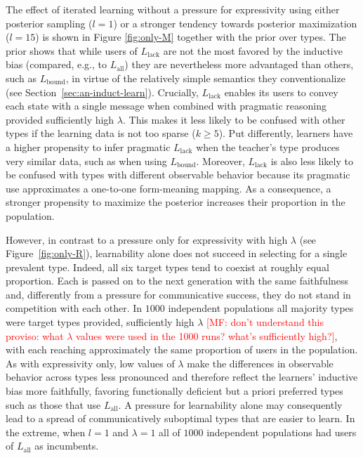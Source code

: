 \documentclass[a4paper, 11pt]{article}
\theoremstyle{Satz}
\newcommand{\mf}[1]{\textcolor{Red}{[MF: #1]}}
\newcommand{\mylang}[1]{\ensuremath{L_{\text{#1}}}\xspace} %
\newcommand{\Lall}{\mylang{all}}
\newcommand{\Lbound}{\mylang{bound}}
\newcommand{\Llack}{\mylang{lack}}
\begin{document}
The effect of iterated learning without a pressure for expressivity using either posterior
sampling ($l = 1$) or a stronger tendency towards posterior maximization ($l = 15$) is shown in
Figure \ref{fig:only-M} together with the prior over types. The prior shows that while users of
$\Llack$ are not the most favored by the inductive bias (compared, e.g., to $\Lall$) they are
nevertheless more advantaged than others, such as $\Lbound$, in virtue of the relatively simple
semantics they conventionalize (see Section~\ref{sec:an-induct-learn}). Crucially, $\Llack$
enables its users to convey each state with a single message when combined with pragmatic
reasoning provided sufficiently high $\lambda$. This makes it less likely to be confused with
other types if the learning data is not too sparse ($k \geq 5$). Put differently, learners have
a higher propensity to infer pragmatic $\Llack$ when the teacher's type produces very similar
data, such as when using $\Lbound$. Moreover, $\Llack$ is also less likely to be confused with
types with different observable behavior because its pragmatic use approximates a one-to-one
form-meaning mapping. As a consequence, a stronger propensity to maximize the posterior
increases their proportion in the population.

However, in contrast to a pressure only for expressivity with high $\lambda$ (see
Figure~\ref{fig:only-R}), learnability alone does not succeed in selecting for a single
prevalent type. Indeed, all six target types tend to coexist at roughly equal proportion. Each
is passed on to the next generation with the same faithfulness and, differently from a pressure
for communicative success, they do not stand in competition with each other. In $1000$
independent populations all majority types were target types provided, sufficiently high
$\lambda$ \mf{don't understand this proviso: what $\lambda$ values were used in the 1000
  runs? what's sufficiently high?}, with each reaching approximately the same proportion of users in the population. As
with expressivity only, low values of $\lambda$ make the differences in observable behavior
across types less pronounced and therefore reflect the learners' inductive bias more
faithfully, favoring functionally deficient but a priori preferred types such as those that use
$\Lall$. A pressure for learnability alone may consequently lead to a spread of communicatively
suboptimal types that are easier to learn. In the extreme, when $l = 1$ and $\lambda = 1$ all
of $1000$ independent populations had users of $\Lall$ as incumbents.
\end{document}
